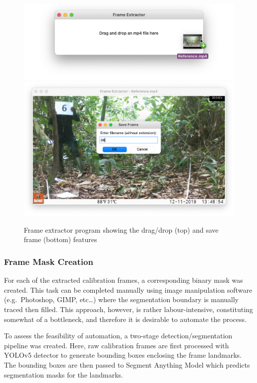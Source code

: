 \begin{figure}[htbp]
    \centering
    \includegraphics[scale=0.5]{body/experimental/assets/frame_extractor/drag_drop}
    \vspace{-3mm}
    \includegraphics[scale=0.5]{body/experimental/assets/frame_extractor/save_frame}
    \caption{Frame extractor program showing the drag/drop (top) and save frame (bottom) features}
    \label{fig:frame_extractor}
\end{figure}

\clearpage

\subsubsection{Frame Mask Creation}

For each of the extracted calibration frames, a corresponding binary mask was created.
This task can be completed manually using image manipulation software (e.g.\ Photoshop,
GIMP, etc\ldots) where the segmentation boundary is manually traced then filled.
This approach, however, is rather labour-intensive, constituting somewhat
of a bottleneck, and therefore it is desirable to automate the process.

To assess the feasibility of automation, a two-stage detection/segmentation pipeline was
created.
Here, raw calibration frames are first processed with YOLOv5 detector\cite{YOLO} to
generate bounding boxes enclosing the frame landmarks.
The bounding boxes are then passed to Segment Anything Model which predicts segmentation
masks for the landmarks.


